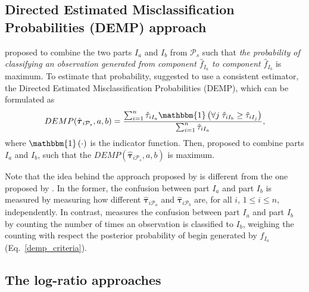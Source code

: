 \documentclass[10pt, a4paper]{article}
\newcommand{\m}[1]{\boldsymbol{#1}}
\begin{document}
\begin{spacing}{1.9}
\subsection{Directed Estimated Misclassification Probabilities (DEMP) approach}

\cite{hennig2010methods} proposed to combine the two parts $I_a$ and $I_b$ from $ \mathcal{P}_s$ such that \emph{the probability of classifying an observation generated from component $\hat{f}_{I_a}$ to component $\hat{f}_{I_b}$} is maximum. To estimate that probability,  \cite{hennig2010methods} suggested to use a consistent estimator, the Directed Estimated Misclassification Probabilities (DEMP), which can be formulated as
\begin{equation}\label{demp_criteria}
DEMP(\hat{\m \tau}_{i \mathcal{P}_s}, a, b) =\frac{ \sum_{i=1}^n {\hat{\tau}_{i I_a} \mathbbm{1}\left( \forall j\; \hat{\tau}_{i I_{b}} \geq \hat{\tau}_{i I_j} \right)}}{\sum_{i=1}^n \hat{\tau}_{i I_a} },
\end{equation}
where $\mathbbm{1}\left( \cdot \right)$ is the indicator function. Then, \cite{hennig2010methods} proposed to combine parts $I_a$ and $I_b$, such that the $DEMP(\hat{\m \tau}_{i \mathcal{P}_s}, a, b)$ is maximum.

Note that the idea behind the approach proposed by \cite{baudry2010combining} is different from the one proposed by \cite{hennig2010methods}. In the former, the confusion between part $I_a$ and part $I_b$ is measured by measuring how different $\hat{\m \tau}_{i \mathcal{P}_a}$ and $\hat{\m \tau}_{i \mathcal{P}_b}$ are, for all $i$, $1\leq i \leq n$, independently. In contrast, \cite{hennig2010methods} measures the confusion between part $I_a$ and part $I_b$ by counting the number of times an observation is classified to $I_b$, weighing the counting with respect the posterior probability of begin generated by $\hat{f}_{I_a}$ (Eq.~\ref{demp_criteria}).

\subsection{The log-ratio approaches}
\label{lr_approach}


\end{spacing}
\end{document}
